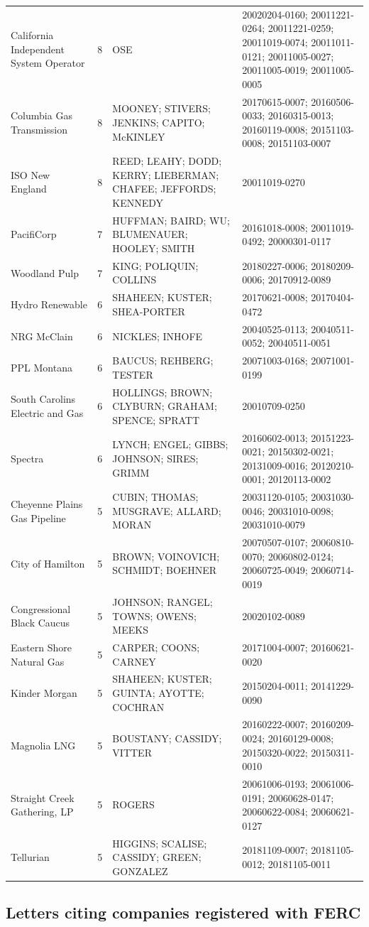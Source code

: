 \documentclass[]{article}
\begin{document}
\begin{longtable}[]{@{}lrll@{}}
California Independent System Operator & 8 & OSE & 20020204-0160;
20011221-0264; 20011221-0259; 20011019-0074; 20011011-0121;
20011005-0027; 20011005-0019; 20011005-0005\tabularnewline
Columbia Gas Transmission & 8 & MOONEY; STIVERS; JENKINS; CAPITO;
McKINLEY & 20170615-0007; 20160506-0033; 20160315-0013; 20160119-0008;
20151103-0008; 20151103-0007\tabularnewline
ISO New England & 8 & REED; LEAHY; DODD; KERRY; LIEBERMAN; CHAFEE;
JEFFORDS; KENNEDY & 20011019-0270\tabularnewline
PacifiCorp & 7 & HUFFMAN; BAIRD; WU; BLUMENAUER; HOOLEY; SMITH &
20161018-0008; 20011019-0492; 20000301-0117\tabularnewline
Woodland Pulp & 7 & KING; POLIQUIN; COLLINS & 20180227-0006;
20180209-0006; 20170912-0089\tabularnewline
Hydro Renewable & 6 & SHAHEEN; KUSTER; SHEA-PORTER & 20170621-0008;
20170404-0472\tabularnewline
NRG McClain & 6 & NICKLES; INHOFE & 20040525-0113; 20040511-0052;
20040511-0051\tabularnewline
PPL Montana & 6 & BAUCUS; REHBERG; TESTER & 20071003-0168;
20071001-0199\tabularnewline
South Carolins Electric and Gas & 6 & HOLLINGS; BROWN; CLYBURN; GRAHAM;
SPENCE; SPRATT & 20010709-0250\tabularnewline
Spectra & 6 & LYNCH; ENGEL; GIBBS; JOHNSON; SIRES; GRIMM &
20160602-0013; 20151223-0021; 20150302-0021; 20131009-0016;
20120210-0001; 20120113-0002\tabularnewline
Cheyenne Plains Gas Pipeline & 5 & CUBIN; THOMAS; MUSGRAVE; ALLARD;
MORAN & 20031120-0105; 20031030-0046; 20031010-0098;
20031010-0079\tabularnewline
City of Hamilton & 5 & BROWN; VOINOVICH; SCHMIDT; BOEHNER &
20070507-0107; 20060810-0070; 20060802-0124; 20060725-0049;
20060714-0019\tabularnewline
Congressional Black Caucus & 5 & JOHNSON; RANGEL; TOWNS; OWENS; MEEKS &
20020102-0089\tabularnewline
Eastern Shore Natural Gas & 5 & CARPER; COONS; CARNEY & 20171004-0007;
20160621-0020\tabularnewline
Kinder Morgan & 5 & SHAHEEN; KUSTER; GUINTA; AYOTTE; COCHRAN &
20150204-0011; 20141229-0090\tabularnewline
Magnolia LNG & 5 & BOUSTANY; CASSIDY; VITTER & 20160222-0007;
20160209-0024; 20160129-0008; 20150320-0022;
20150311-0010\tabularnewline
Straight Creek Gathering, LP & 5 & ROGERS & 20061006-0193;
20061006-0191; 20060628-0147; 20060622-0084;
20060621-0127\tabularnewline
Tellurian & 5 & HIGGINS; SCALISE; CASSIDY; GREEN; GONZALEZ &
20181109-0007; 20181105-0012; 20181105-0011\tabularnewline
\bottomrule
\end{longtable}

\subsection{Letters citing companies registered with
FERC}\label{letters-citing-companies-registered-with-ferc}
\end{document}

